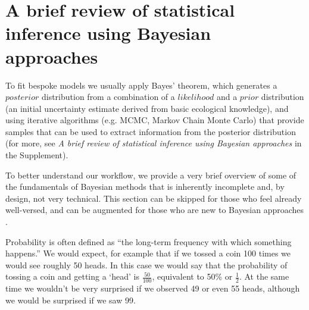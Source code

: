 \documentclass[11pt]{article}
\begin{document}
\section*{A brief review of statistical inference using Bayesian approaches}

To fit bespoke models we usually apply Bayes' theorem, which generates a $posterior$ distribution from a combination of a $likelihood$ and a $prior$ distribution (an initial uncertainty estimate derived from basic ecological knowledge), and using iterative algorithms (e.g. MCMC, Markov Chain Monte Carlo) that provide samples that can be used to extract information from the posterior distribution (for more, see \emph{A brief review of statistical inference using Bayesian approaches} in the Supplement). 


To better understand our workflow, we provide a very brief overview of some of the fundamentals of Bayesian methods that is inherently incomplete and, by design, not very technical. This section can be skipped for those who feel already well-versed, and can be augmented for those who are new to Bayesian approaches \citep[for example,][]{statrethink,BDA,regotherstories}.

Probability is often defined as ``the long-term frequency with which something happens.'' We would expect, for example that if we tossed a coin 100 times we would see roughly 50 heads. In this case we would say that the probability of tossing a coin and getting a `head' is $\frac{50}{100}$, equivalent to 50\% or $\frac{1}{2}$. At the same time we wouldn't be very surprised if we observed 49 or even 55 heads, although we would be surprised if we saw 99.
\end{document}
